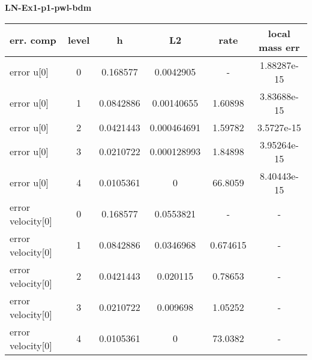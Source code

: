 \documentclass{amsart}
\begin{document}
\begin{center}   
{\bf LN-Ex1-p1-pwl-bdm }\end{center}  
\tableofcontents

\begin{table}[h!]
\begin{tabular}{|l|c|c|c|c|c|}
\hline
err. comp & level & h  & L2 & rate  & local mass err \\ 
\hline
error u[0] & 0 & 0.168577  & 0.0042905 & -   &  1.88287e-15 \\ 
error u[0] & 1 & 0.0842886 & 0.00140655 & 1.60898   &  3.83688e-15 \\ 
error u[0] & 2 & 0.0421443 & 0.000464691 & 1.59782   &  3.5727e-15 \\ 
error u[0] & 3 & 0.0210722 & 0.000128993 & 1.84898   &  3.95264e-15 \\ 
error u[0] & 4 & 0.0105361 & 0 & 66.8059   &  8.40443e-15 \\ 
error velocity[0] & 0 & 0.168577  & 0.0553821 & -   & - \\ 
error velocity[0] & 1 & 0.0842886 & 0.0346968 & 0.674615   & - \\ 
error velocity[0] & 2 & 0.0421443 & 0.020115  & 0.78653   & - \\ 
error velocity[0] & 3 & 0.0210722 & 0.009698  & 1.05252   & - \\ 
error velocity[0] & 4 & 0.0105361 & 0 & 73.0382   & - \\ 

\hline
\end{tabular}
\end{table}
\end{document}
